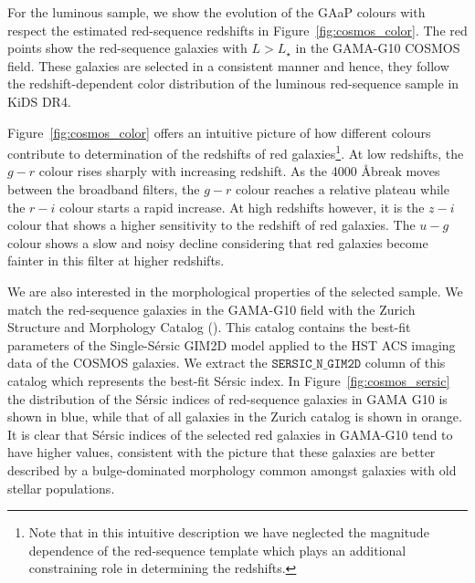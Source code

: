 \documentclass{aa}
\numberwithin{equation}{section}
\begin{document}
For the luminous sample, we show the evolution of the GAaP colours with respect the estimated red-sequence redshifts in Figure~\ref{fig:cosmos_color}. The red points show the red-sequence galaxies with $L>L_{\star}$ in the GAMA-G10 COSMOS field. These galaxies are selected in a consistent manner and hence, they follow the redshift-dependent color distribution of the luminous red-sequence sample in KiDS DR4. 

Figure~\ref{fig:cosmos_color} offers an intuitive picture of how different colours contribute to determination of the redshifts of red galaxies\footnote{Note that in this intuitive description we have neglected the magnitude dependence of the red-sequence template which plays an additional constraining role in determining the redshifts.}. At low redshifts, the $g-r$ colour rises sharply with increasing redshift. As the 4000 \AA break moves between the broadband filters, the $g-r$ colour reaches a relative plateau while the $r-i$ colour starts a rapid increase. At high redshifts however, it is the $z-i$ colour that shows a higher sensitivity to the redshift of red galaxies. The $u-g$ colour shows a slow and noisy decline considering that red galaxies become fainter in this filter at higher redshifts. 




We are also interested in the morphological properties of the selected sample. We match the red-sequence galaxies in the GAMA-G10 field with the Zurich Structure and Morphology Catalog (\citealt{scarlata2007, sargent2007}). This catalog contains the best-fit parameters of the Single-S\'{e}rsic GIM2D model applied to the HST ACS imaging data of the COSMOS galaxies. We extract the $\mathtt{SERSIC\_N\_GIM2D}$ column of this catalog which represents the best-fit S\'{e}rsic index. In Figure~\ref{fig:cosmos_sersic} the distribution of the S\'{e}rsic indices of red-sequence galaxies in GAMA G10 is shown in blue, while that of all galaxies in the Zurich catalog is shown in orange. It is clear that S\'{e}rsic indices of the selected red galaxies in GAMA-G10 tend to have higher values, consistent with the picture that these galaxies are better described by a bulge-dominated morphology common amongst galaxies with old stellar populations.
\end{document}
